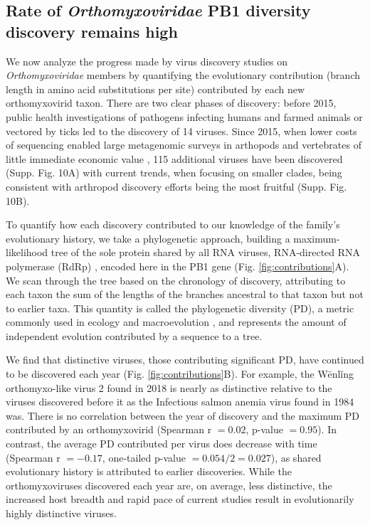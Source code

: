 \documentclass[11pt]{article}
\begin{document}
\subsection{Rate of \textit{Orthomyxoviridae} PB1 diversity discovery remains high}

We now analyze the progress made by virus discovery studies on \textit{Orthomyxoviridae} members by quantifying the evolutionary contribution (branch length in amino acid substitutions per site) contributed by each new orthomyxovirid taxon.
There are two clear phases of discovery: before 2015, public health investigations of pathogens infecting humans and farmed animals or vectored by ticks led to the discovery of 14 viruses.
Since 2015, when lower costs of sequencing enabled large metagenomic surveys in arthopods and vertebrates of little immediate economic value \citep{li_unprecedented_2015, shi_evolutionary_2018}, 115 additional viruses have been discovered (Supp. Fig. 10A) with current trends, when focusing on smaller clades, being consistent with arthropod discovery efforts being the most fruitful (Supp. Fig. 10B).


To quantify how each discovery contributed to our knowledge of the family's evolutionary history, we take a phylogenetic approach, building a maximum-likelihood tree of the sole protein shared by all RNA viruses, RNA-directed RNA polymerase (RdRp) \citep{koonin_virus_2014}, encoded here in the PB1 gene \citep{kobayashi_influenza_1996} (Fig. \ref{fig:contributions}A).
We scan through the tree based on the chronology of discovery, attributing to each taxon the sum of the lengths of the branches ancestral to that taxon but not to earlier taxa.
This quantity is called the phylogenetic diversity (PD), a metric commonly used in ecology and macroevolution \citep{lum_tracking_2022}, and represents the amount of independent evolution \citep{felsenstein_phylogenies_1985} contributed by a sequence to a tree.


We find that distinctive viruses, those contributing significant PD, have continued to be discovered each year (Fig. \ref{fig:contributions}B).
For example, the W\={e}nl\v{i}ng orthomyxo-like virus 2 found in 2018 is nearly as distinctive relative to the viruses discovered before it as the Infectious salmon anemia virus found in 1984 was.
There is no correlation between the year of discovery and the maximum PD contributed by an orthomyxovirid (Spearman r $ = 0.02$, p-value $ = 0.95$).
In contrast, the average PD contributed per virus does decrease with time (Spearman r $ = -0.17$, one-tailed p-value $ = 0.054/2=0.027$), as shared evolutionary history is attributed to earlier discoveries.
While the orthomyxoviruses discovered each year are, on average, less distinctive, the increased host breadth and rapid pace of current studies result in evolutionarily highly distinctive viruses.
\end{document}
